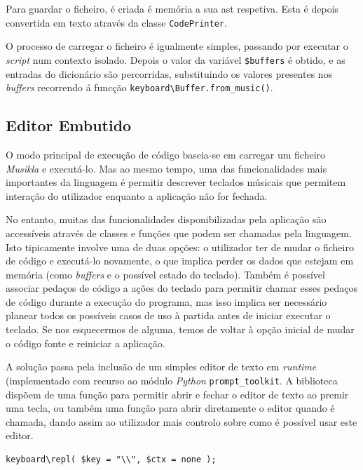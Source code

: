 Para guardar o ficheiro, é criada é memória a sua \acrshort{ast} respetiva. Esta é depois convertida em texto através da classe \texttt{CodePrinter}.

O processo de carregar o ficheiro é igualmente simples, passando por executar o \textit{script} num contexto isolado. Depois o valor da variável \texttt{\$buffers} é obtido, e as entradas do dicionário são percorridas, substituindo os valores presentes nos \textit{buffers} recorrendo á funcção \texttt{keyboard\textbackslash{}Buffer.from\_music()}.

\subsection{Editor Embutido}
O modo principal de execução de código baseia-se em carregar um ficheiro \textit{Musikla} e executá-lo. Mas ao mesmo tempo, uma das funcionalidades mais importantes da linguagem é permitir descrever teclados músicais que permitem interação do utilizador enquanto a aplicação não for fechada.

No entanto, muitas das funcionalidades disponibilizadas pela aplicação são accessíveis através de classes e funções que podem ser chamadas pela linguagem. Isto tipicamente involve uma de duas opções: o utilizador ter de mudar o ficheiro de código e executá-lo novamente, o que implica perder os dados que estejam em memória (como \textit{buffers} e o possível estado do teclado). Também é possível associar pedaços de código a ações do teclado para permitir chamar esses pedaços de código durante a execução do programa, mas isso implica ser necessário planear todos os possíveis casos de uso à partida antes de iniciar executar o teclado. Se nos esquecermos de alguma, temos de voltar à opção inicial de mudar o código fonte e reiniciar a aplicação.

A solução passa pela inclusão de um simples editor de texto em \textit{runtime} (implementado com recurso ao módulo \textit{Python} \texttt{prompt\_toolkit}. A biblioteca dispõem de uma função para permitir abrir e fechar o editor de texto ao premir uma tecla, ou também uma função para abrir diretamente o editor quando é chamada, dando assim ao utilizador mais controlo sobre como é possível usar este editor.

\begin{lstlisting}[caption={Abre o editor quando a tecla \textbackslash{} é premida},label={lst:kb-editor-1}]
keyboard\repl( $key = "\\", $ctx = none );
\end{lstlisting}

